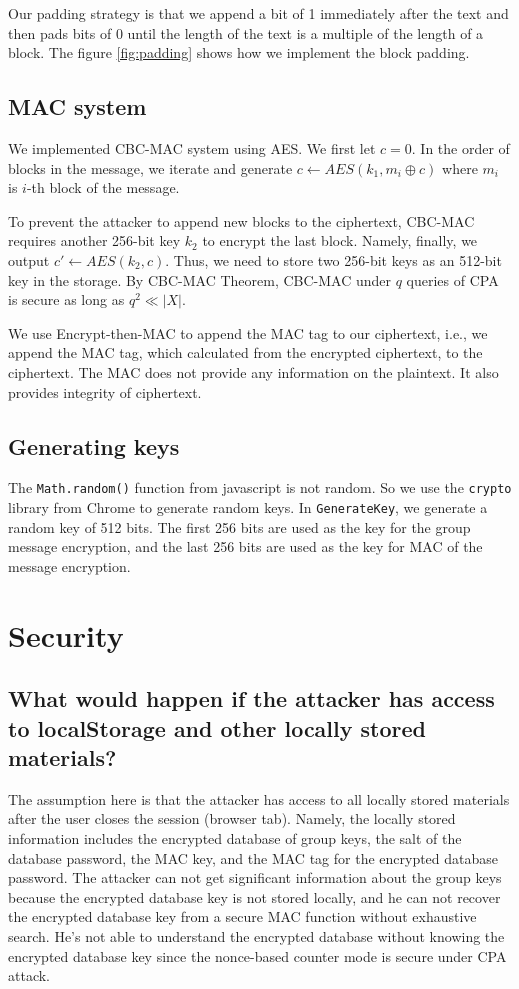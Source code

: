 Our padding strategy is that we append a bit of 1 immediately after the text and then pads bits of 0 until the length of the text is a multiple of the length of a block. The figure \ref{fig:padding} shows how we implement the block padding. 

\subsection{MAC system}
We implemented CBC-MAC system using AES. 
We first let $c = 0$. In the order of blocks in the message, we iterate and generate $c \gets AES(k_1, m_i \oplus c)$ where $m_i$ is $i$-th block of the message. 

To prevent the attacker to append new blocks to the ciphertext, CBC-MAC requires another 256-bit key $k_2$ to encrypt the last block. Namely, finally, we output $c' \gets AES(k_2, c)$. Thus, we need to store two 256-bit keys as an 512-bit key in the storage. 
By CBC-MAC Theorem, CBC-MAC under $q$ queries of CPA is secure as long as  $q^2 \ll |X|$.

We use Encrypt-then-MAC to append the MAC tag to our ciphertext, i.e., we append the MAC tag, which calculated from the encrypted ciphertext, to the ciphertext. 
The MAC does not provide any information on the plaintext. It also provides integrity of ciphertext. 

\subsection{Generating keys}
The \texttt{Math.random()} function from javascript is not random. So we use the \texttt{crypto} library from Chrome to generate random keys. In \texttt{GenerateKey}, we generate a random key of 512 bits. The first 256 bits are used as the key for the group message encryption, and the last 256 bits are used as the key for MAC of the message encryption. 

\section{Security}
\subsection{What would happen if the attacker has access to localStorage and other locally stored materials? }
The assumption here is that the attacker has access to all locally stored materials after the user closes the session (browser tab). Namely, the locally stored information includes the encrypted database of  group keys, the salt of the database password, the MAC key, and the MAC tag for the encrypted database password. The attacker can not get significant information about the group keys because the encrypted database key is not stored locally, and he can not recover the encrypted database key from a secure MAC function without exhaustive search. He's not able to understand the encrypted database without knowing the encrypted database key since the nonce-based counter mode is secure under CPA attack. 

